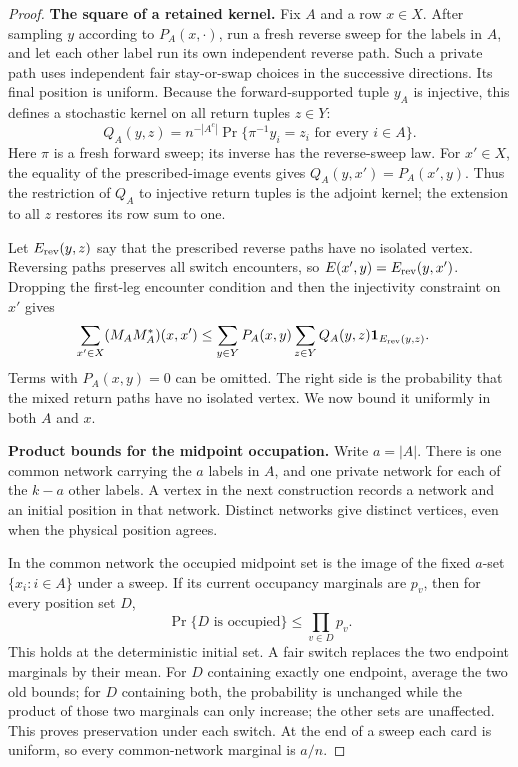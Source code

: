 \begin{proof}
\medskip\noindent\textbf{The square of a retained kernel.}\enspace
Fix $A$ and a row $x\in X$.  After sampling $y$ according to $P_A(x,\cdot)$,
run a fresh reverse sweep for the labels in $A$, and let each other
label run its own independent reverse path.  Such a private path uses
independent fair stay-or-swap choices in the successive directions.
Its final position is uniform.  Because the forward-supported tuple
$y_A$ is injective, this defines a stochastic kernel on all return
tuples $z\in Y$:
\[
 Q_A(y,z)=n^{-|A^c|}
 \Pr\{\pi^{-1}y_i=z_i\text{ for every }i\in A\}.
\]
Here $\pi$ is a fresh forward sweep; its inverse has the reverse-sweep
law.  For $x'\in X$, the equality of the prescribed-image events gives
$Q_A(y,x')=P_A(x',y)$.  Thus the restriction of $Q_A$ to injective return
tuples is the adjoint kernel; the extension to all $z$ restores its
row sum to one.

Let $E_{\rm rev}(y,z)$ say that the prescribed reverse paths have no
isolated vertex.  Reversing paths preserves all switch encounters, so
$E(x',y)=E_{\rm rev}(y,x')$.  Dropping the first-leg encounter condition
and then the injectivity constraint on $x'$ gives
\begin{align}
 \sum_{x'\in X}(M_AM_A^*)(x,x')
 &\le \sum_{y\in Y}P_A(x,y)
       \sum_{z\in Y}Q_A(y,z)\mathbf1_{E_{\rm rev}(y,z)}.
 \label{n:contact-square-law}
\end{align}
Terms with $P_A(x,y)=0$ can be omitted.  The right side is the probability
that the mixed return paths have no isolated vertex.  We now bound it
uniformly in both $A$ and $x$.

\medskip\noindent\textbf{Product bounds for the midpoint occupation.}\enspace
Write $a=|A|$.  There is one common network carrying the $a$ labels in
$A$, and one private network for each of the $k-a$ other labels.
A vertex in the next construction records a network and an initial
position in that network.  Distinct networks give distinct vertices,
even when the physical position agrees.

In the common network the occupied midpoint set is the image of the
fixed $a$-set $\{x_i:i\in A\}$ under a sweep.  If its current occupancy
marginals are $p_v$, then for every position set $D$,
\begin{equation}\label{n:contact-occupation-products}
 \Pr\{D\text{ is occupied}\}\le\prod_{v\in D}p_v.
\end{equation}
This holds at the deterministic initial set.  A fair switch replaces
the two endpoint marginals by their mean.  For $D$ containing exactly
one endpoint, average the two old bounds; for $D$ containing both,
the probability is unchanged while the product of those two marginals
can only increase; the other sets are unaffected.  This proves
preservation under each switch.  At the end of a sweep each card is
uniform, so every common-network marginal is $a/n$.


\end{proof}
